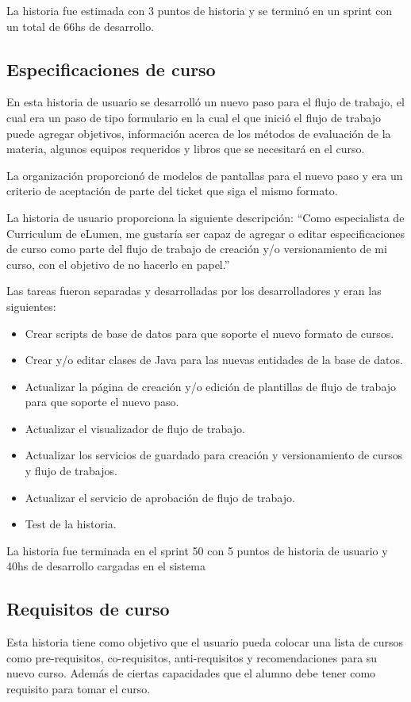 La historia fue estimada con 3 puntos de historia y se terminó en un sprint con un total de 66hs de desarrollo.

\subsection{Especificaciones de curso}
En esta historia de usuario se desarrolló un nuevo paso para el flujo de trabajo, el cual era un paso de tipo formulario en la cual el que inició el flujo de trabajo puede agregar objetivos, información acerca de los métodos de evaluación de la materia, algunos equipos requeridos y libros que se necesitará en el curso.

La organización proporcionó de modelos de pantallas para el nuevo paso y era un criterio de aceptación de parte del ticket que siga el mismo formato.

La historia de usuario proporciona la siguiente descripción: “Como especialista de Curriculum de eLumen, me gustaría ser capaz de agregar o editar especificaciones de curso como parte del flujo de trabajo de creación y/o versionamiento de mi curso, con el objetivo de no hacerlo en papel.”

Las tareas fueron separadas y desarrolladas por los desarrolladores y eran las siguientes:
\begin{itemize}
	\item Crear scripts de base de datos para que soporte el nuevo formato de cursos.
	\item Crear y/o editar clases de Java para las nuevas entidades de la base de datos.
	\item Actualizar la página de creación y/o edición de plantillas de flujo de trabajo para que soporte el nuevo paso.
	\item Actualizar el visualizador de flujo de trabajo.
	\item Actualizar los servicios de guardado para creación y versionamiento de cursos y flujo de trabajos.
	\item Actualizar el servicio de aprobación de flujo de trabajo.
	\item Test de la historia.
\end{itemize}

La historia fue terminada en el sprint 50 con 5 puntos de historia de usuario y 40hs de desarrollo cargadas en el sistema

\subsection{Requisitos de curso}
Esta historia tiene como objetivo que el usuario pueda colocar una lista de cursos como pre-requisitos, co-requisitos, anti-requisitos y recomendaciones para su nuevo curso. Además de ciertas capacidades que el alumno debe tener como requisito para tomar el curso.


